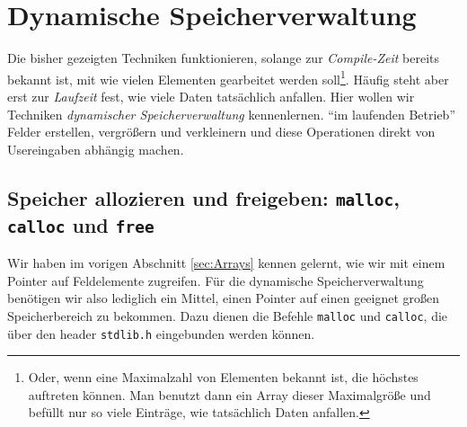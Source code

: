
\section{Dynamische Speicherverwaltung} \label{sec:dynArrays}
Die bisher gezeigten Techniken funktionieren, solange zur \emph{Compile-Zeit} bereits bekannt ist, mit wie vielen Elementen gearbeitet werden soll\footnote{Oder, wenn eine Maximalzahl von Elementen bekannt ist, die höchstes auftreten können. Man benutzt dann ein Array dieser Maximalgröße und befüllt nur so viele Einträge, wie tatsächlich Daten anfallen.}. Häufig steht aber erst zur \emph{Laufzeit} fest, wie viele Daten tatsächlich anfallen. Hier wollen wir Techniken \emph{dynamischer Speicherverwaltung} kennenlernen. \ie \enquote{im laufenden Betrieb} Felder erstellen, vergrößern und verkleinern und diese Operationen direkt von Usereingaben abhängig machen.

\subsection{Speicher allozieren und freigeben: \texttt{malloc}, \texttt{calloc} und \texttt{free}}
\label{sec:allocation}
Wir haben im vorigen Abschnitt \ref{sec:Arrays} kennen gelernt, wie wir mit einem Pointer auf Feldelemente zugreifen. Für die dynamische Speicherverwaltung benötigen wir also lediglich ein Mittel, einen Pointer auf einen geeignet großen Speicherbereich zu bekommen. Dazu dienen die Befehle \texttt{malloc} und \texttt{calloc}, die über den header \texttt{stdlib.h} eingebunden werden können.

